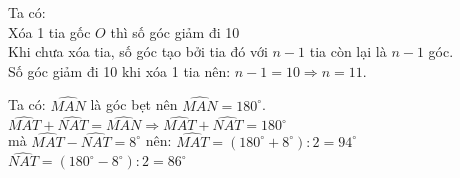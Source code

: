 \begin{Answer}{49}
		Ta có:\\
		Xóa 1 tia gốc $O$ thì số góc giảm đi 10\\
		Khi chưa xóa tia, số góc tạo bởi tia đó với $n-1$ tia còn lại là $n-1$ góc.\\
		Số góc giảm đi 10 khi xóa 1 tia nên: $n-1=10 \Rightarrow n=11$.
	
\end{Answer}
\begin{Answer}{50}
		Ta có: $\widehat{MAN}$ là góc bẹt nên $\widehat{MAN}={{180}^\circ}$.\\
		$\widehat{MAT}+\widehat{NAT}=\widehat{MAN}\Rightarrow \widehat{MAT}+\widehat{NAT}={{180}^\circ}$\\
		mà  $\widehat{MAT}-\widehat{NAT}={{8}^\circ}$  nên:
		$\widehat{MAT}=\left({{180}^\circ}+{{8}^\circ}\right):2={{94}^\circ}$ \\
		$\widehat{NAT}=\left({{180}^\circ}-{{8}^\circ}\right):2={{86}^\circ}$ \\
	
\end{Answer}
